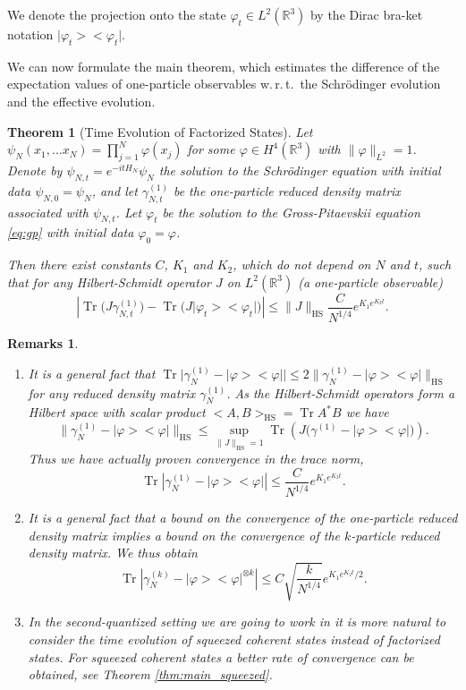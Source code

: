 \documentclass[11pt,a4paper,draft,DIV11]{scrartcl}	%
\newtheorem{thm}{Theorem}[section]
\newtheorem*{rems}{Remarks}
\newcommand{\scal}[2]{\big<#1,#2\big>} %
\newcommand{\Rbb}{\mathbb{R}}		%
\newcommand{\norm}[1]{\lVert#1\rVert}	%
\newcommand{\project}[1]{\lvert #1 \big>\big< #1\rvert}	%
\newcommand{\Tr}{\operatorname{Tr}}	%
\newcommand{\HS}{_{\textrm{HS}}}
\newcommand{\bd}{\begin{displaymath}}			%
\newcommand{\ed}{\end{displaymath}}
\newcommand{\eqr}[1]{\eqref{eq:#1}}			%
\begin{document}
We denote the projection onto the state $\varphi_t \in L^2(\Rbb^3)$ by the Dirac bra-ket notation $\project{\varphi_t}$.

We can now formulate the main theorem, which estimates the difference of the expectation values of one-particle observables w.\,r.\,t.\ the Schr\"odinger evolution and the effective evolution.

\begin{thm}[Time Evolution of Factorized States] \label{thm:main_factorized}
 Let $\psi_N(x_1, \ldots x_N) = \prod_{j=1}^N \varphi(x_j)$ for some $\varphi \in H^4(\Rbb^3)$ with $\norm{\varphi}_{L^2} = 1$. Denote by $\psi_{N,t} = e^{-it H_N}\psi_N$ the solution to the Schr\"odinger equation with initial data $\psi_{N,0}= \psi_N$, and let $\gamma_{N,t}^{(1)}$ be the one-particle reduced density matrix associated with $\psi_{N,t}$.
Let $\varphi_t$ be the solution to the Gross-Pitaevskii equation \eqr{gp} with initial data $\varphi_0 = \varphi$.

 Then there exist constants $C$, $K_1$ and $K_2$, which do not depend on $N$
 and $t$, such that for any Hilbert-Schmidt operator $J$ on $L^2(\Rbb^3)$ (a one-particle observable)
\bd
\left\lvert \Tr\Big(J \gamma_{N,t}^{(1)} \Big) - \Tr\Big( J \project{\varphi_t}  \Big) \right\rvert \leq \norm{J}\HS \frac{C}{N^{1/4}}e^{K_1 e^{K_2 t}}.
\ed
\end{thm}

\begin{rems}
\begin{enumerate}
\item It is a general fact \cite{RS2009} that $\Tr \big\lvert \gamma_{N}^{(1)} - \project{\varphi} \big\rvert \leq 2 \norm{\gamma_N^{(1)} - \project{\varphi}}\HS$ for any reduced density matrix $\gamma^{(1)}_N$. As the Hilbert-Schmidt operators form a Hilbert space with scalar product $\scal{A}{B}\HS = \Tr A^\ast B$ we have 
\[\norm{\gamma_N^{(1)} - \project{\varphi}}\HS \leq \sup_{\norm{J}\HS=1} \Tr \left( J \big( \gamma^{(1)}- \project{\varphi} \big) \right).\]
 Thus we have actually proven convergence in the trace norm,
\bd
\Tr \left\lvert \gamma_{N}^{(1)} - \project{\varphi} \right\rvert \leq \frac{C}{N^{1/4}}e^{K_1 e^{K_2 t}}.
\ed
\item It is a general fact \cite{KP2009} that a bound on the convergence of the one-particle reduced density matrix implies a bound on the convergence of the $k$-particle reduced density matrix. We thus obtain
\bd
\Tr \left\lvert \gamma_{N}^{(k)} - \project{\varphi}^{\otimes k} \right\rvert \leq C\sqrt{ \frac{k}{ N^{1/4} } }e^{K_1 e^{K_2 t}/2}.
\ed
\item In the second-quantized setting we are going to work in it is more natural to consider the time evolution of squeezed coherent states instead of factorized states. For squeezed coherent states a better rate of convergence can be obtained, see Theorem \ref{thm:main_squeezed}.
\end{enumerate}
\end{rems}
\end{document}
